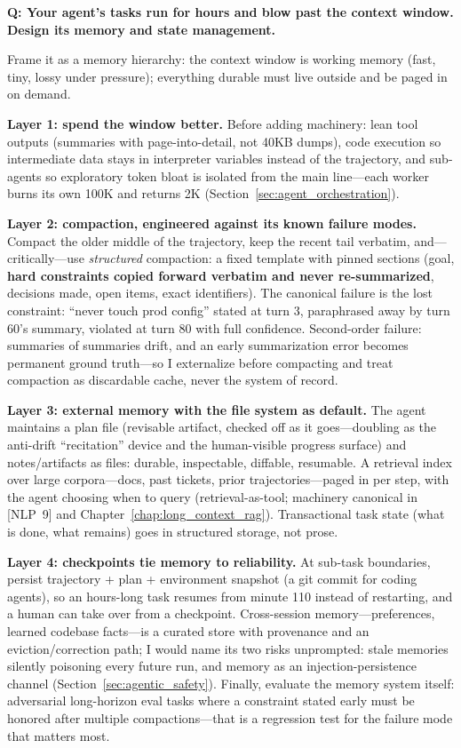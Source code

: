 \begin{interviewq}
\textbf{Q: Your agent's tasks run for hours and blow past the context window. Design its memory and state management.}

 \quad {} \quad \badgefreq{\freqmed}

\stronganswer

Frame it as a memory hierarchy: the context window is working memory (fast, tiny, lossy under pressure); everything durable must live outside and be paged in on demand.

\textbf{Layer 1: spend the window better.} Before adding machinery: lean tool outputs (summaries with page-into-detail, not 40KB dumps), code execution so intermediate data stays in interpreter variables instead of the trajectory, and sub-agents so exploratory token bloat is isolated from the main line---each worker burns its own 100K and returns 2K (Section~\ref{sec:agent_orchestration}).

\textbf{Layer 2: compaction, engineered against its known failure modes.} Compact the older middle of the trajectory, keep the recent tail verbatim, and---critically---use \textit{structured} compaction: a fixed template with pinned sections (goal, \textbf{hard constraints copied forward verbatim and never re-summarized}, decisions made, open items, exact identifiers). The canonical failure is the lost constraint: ``never touch prod config'' stated at turn 3, paraphrased away by turn 60's summary, violated at turn 80 with full confidence. Second-order failure: summaries of summaries drift, and an early summarization error becomes permanent ground truth---so I externalize before compacting and treat compaction as discardable cache, never the system of record.

\textbf{Layer 3: external memory with the file system as default.} The agent maintains a plan file (revisable artifact, checked off as it goes---doubling as the anti-drift ``recitation'' device and the human-visible progress surface) and notes/artifacts as files: durable, inspectable, diffable, resumable. A retrieval index over large corpora---docs, past tickets, prior trajectories---paged in per step, with the agent choosing when to query (retrieval-as-tool; machinery canonical in [NLP~9] and Chapter~\ref{chap:long_context_rag}). Transactional task state (what is done, what remains) goes in structured storage, not prose.

\textbf{Layer 4: checkpoints tie memory to reliability.} At sub-task boundaries, persist trajectory + plan + environment snapshot (a git commit for coding agents), so an hours-long task resumes from minute 110 instead of restarting, and a human can take over from a checkpoint. Cross-session memory---preferences, learned codebase facts---is a curated store with provenance and an eviction/correction path; I would name its two risks unprompted: stale memories silently poisoning every future run, and memory as an injection-persistence channel (Section~\ref{sec:agentic_safety}). Finally, evaluate the memory system itself: adversarial long-horizon eval tasks where a constraint stated early must be honored after multiple compactions---that is a regression test for the failure mode that matters most.


\end{interviewq}
